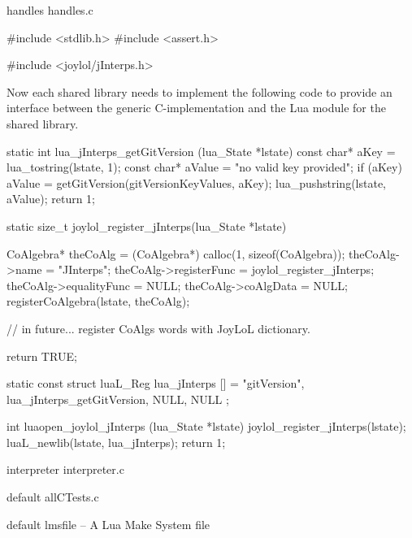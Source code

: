 \createCCodeFile%
  {handles}%
  {handles.c}%
  {}

\startCCode
#include <stdlib.h>
#include <assert.h>

#include <joylol/jInterps.h>
\stopCCode

Now each shared library needs to implement the following code to provide 
an interface between the generic C-implementation and the Lua module for 
the shared library. 

\startCCode
static int lua_jInterps_getGitVersion (lua_State *lstate) {
  const char* aKey   = lua_tostring(lstate, 1);
  const char* aValue = "no valid key provided";
  if (aKey) aValue = getGitVersion(gitVersionKeyValues, aKey);
  lua_pushstring(lstate, aValue);
  return 1;
}

static size_t joylol_register_jInterps(lua_State *lstate) {
  CoAlgebra* theCoAlg    = (CoAlgebra*) calloc(1, sizeof(CoAlgebra));
  theCoAlg->name         = "JInterps";
  theCoAlg->registerFunc = joylol_register_jInterps;
  theCoAlg->equalityFunc = NULL;
  theCoAlg->coAlgData    = NULL;
  registerCoAlgebra(lstate, theCoAlg);
  
  // in future... register CoAlgs words with JoyLoL dictionary. 
  
  return TRUE;
}

static const struct luaL_Reg lua_jInterps [] = {
  {"gitVersion", lua_jInterps_getGitVersion},
  {NULL, NULL}
};

int luaopen_joylol_jInterps (lua_State *lstate) {
  joylol_register_jInterps(lstate);
  luaL_newlib(lstate, lua_jInterps);
  return 1;
}
\stopCCode

\createCCodeFile%
  {interpreter}%
  {interpreter.c}%
  {}

\createCTestFile%
  {default}%
  {allCTests.c}%
  {}





\createLmsfileFile%
  {default}%
  {lmsfile}%
  {-- A Lua Make System file}

